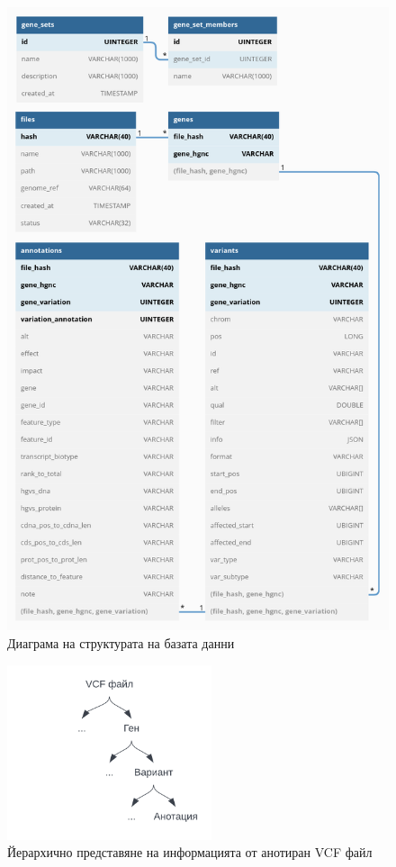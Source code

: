 \documentclass[pdftex,cyrillic,14pt,a4page,twoside,openright]{extreport}
\begin{document}
\begin{figure}[htp]
  \centering
  \includegraphics[width=14cm]{figures/db_diagram}
  \caption {Диаграма на структурата на базата данни}
  \label{fig:db_diagram}
\end{figure}

\begin{figure}[h]
  \centering
  \includegraphics[width=6cm]{figures/annotated_vcf_hierarchy}
  \caption {Йерархично представяне на информацията от анотиран VCF файл}
  \label{fig:annotated_vcf_hierarchy}
\end{figure}
\end{document}
